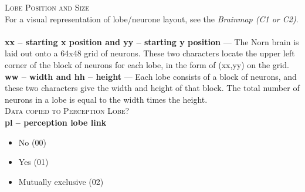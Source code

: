 \documentclass[11pt,twoside,a4paper]{article}
\begin{document}
\textsc{Lobe Position and Size}~\\
For a visual representation of lobe/neurone layout, see the \emph{Brainmap (C1 or C2)}. ~\\

\textbf{xx -- starting x position and yy -- starting y position} --- The Norn brain is laid out onto a 64x48 grid of neurons. These two characters locate the upper left corner of the block of neurons for each lobe, in the form of (xx,yy) on the grid. ~\\

\textbf{ww -- width and hh -- height} --- Each lobe consists of a block of neurons, and these two characters give the width and height of that block. The total number of neurons in a lobe is equal to the width times the height. ~\\

\textsc{Data copied to Perception Lobe?}~\\ 

\textbf{pl -- perception lobe link}
\begin{itemize}
	\item No (00)
	\item Yes (01)
	\item Mutually exclusive (02)
\end{itemize} ~\\

\clearpage
\end{document}

